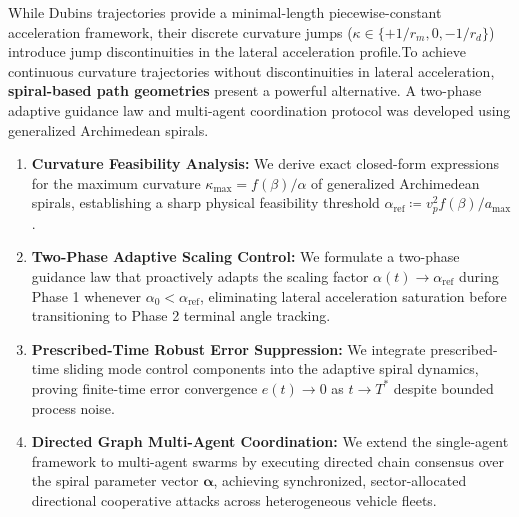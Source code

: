 \documentclass[openright,twoside]{iitbthesis}
\begin{document}
While Dubins trajectories provide a minimal-length piecewise-constant acceleration framework, their discrete curvature jumps ($\kappa \in \{+1/r_m, 0, -1/r_d\}$) introduce jump discontinuities in the lateral acceleration profile.To achieve continuous curvature trajectories without discontinuities in lateral acceleration, \textbf{spiral-based path geometries} present a powerful alternative. A two-phase adaptive guidance law and multi-agent coordination protocol was developed using generalized Archimedean spirals. 
\begin{enumerate}
    \item \textbf{Curvature Feasibility Analysis:} We derive exact closed-form expressions for the maximum curvature $\kappa_{\max} = f(\beta)/\alpha$ of generalized Archimedean spirals, establishing a sharp physical feasibility threshold $\alpha_{\text{ref}} \coloneqq v_p^2 f(\beta) / a_{\max}$.
    \item \textbf{Two-Phase Adaptive Scaling Control:} We formulate a two-phase guidance law that proactively adapts the scaling factor $\alpha(t) \to \alpha_{\text{ref}}$ during Phase 1 whenever $\alpha_0 < \alpha_{\text{ref}}$, eliminating lateral acceleration saturation before transitioning to Phase 2 terminal angle tracking.
    \item \textbf{Prescribed-Time Robust Error Suppression:} We integrate prescribed-time sliding mode control components into the adaptive spiral dynamics, proving finite-time error convergence $e(t) \to 0$ as $t \to T^*$ despite bounded process noise.
    \item \textbf{Directed Graph Multi-Agent Coordination:} We extend the single-agent framework to multi-agent swarms by executing directed chain consensus over the spiral parameter vector $\boldsymbol{\alpha}$, achieving synchronized, sector-allocated directional cooperative attacks across heterogeneous vehicle fleets.
\end{enumerate}
\end{document}
